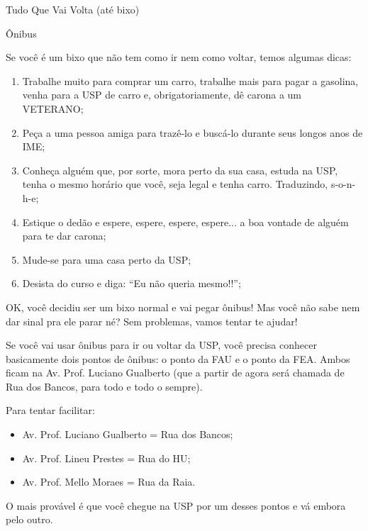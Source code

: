 \begin{secao}{Tudo Que Vai Volta (até bixo)}

\begin{subsecao}{Ônibus}

Se você é um bixo que não tem como ir nem como voltar, temos algumas dicas:

\begin{enumerate}
  \item Trabalhe muito para comprar um carro,
  trabalhe mais para pagar a gasolina,
  venha para a USP de carro e, obrigatoriamente, dê carona a um VETERANO;

  \item Peça a uma pessoa amiga para trazê-lo e buscá-lo durante seus
  longos anos de IME;

  \item Conheça alguém que, por sorte, mora perto da sua casa, estuda na USP,
  tenha o mesmo horário que você, seja legal e tenha carro. Traduzindo, s-o-n-h-e;

  \item Estique o dedão e espere, espere, espere, espere... a boa vontade
  de alguém para te dar carona;

  \item Mude-se para uma casa perto da USP;

  \item Desista do curso e diga: ``Eu não queria mesmo!!'';
\end{enumerate}

OK, você decidiu ser um bixo normal e vai pegar ônibus! Mas você não sabe nem
dar sinal pra ele parar né? Sem problemas, vamos tentar te ajudar!

Se você vai usar ônibus para ir ou voltar da USP, você precisa conhecer
basicamente dois pontos de ônibus: o ponto da FAU e o ponto da
FEA. Ambos ficam na Av. Prof. Luciano Gualberto (que a partir de agora será
chamada de Rua dos Bancos, para todo e todo o sempre).

Para tentar facilitar:
\begin{itemize}
	\item Av. Prof. Luciano Gualberto = Rua dos Bancos;
	\item Av. Prof. Lineu Prestes = Rua do HU;
	\item Av. Prof. Mello Moraes = Rua da Raia.
\end{itemize}

O mais provável é que você chegue na USP por um desses
pontos e vá embora pelo outro.


\end{subsecao}
\end{secao}
